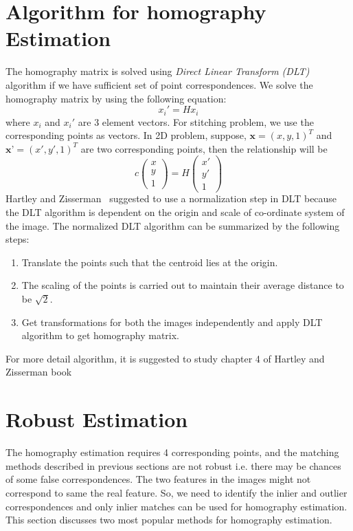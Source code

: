 \section{Algorithm for homography Estimation}
The homography matrix is solved using \emph{Direct Linear Transform (DLT)} algorithm if we have sufficient set of point correspondences. We solve the homography matrix by using the following equation:
\begin{equation}
x_i'=Hx_i
\label{eq:homography-estimation}
\end{equation}
where $x_i$ and $x_i'$ are 3 element vectors. For stitching problem, we use the corresponding points as vectors. In 2D problem, suppose, $\textbf{x}= (x,y,1)^T$ and $\textbf{x'}= (x',y',1)^T$ are two corresponding points, then the relationship will be
\begin{equation}
c\left(
\begin{array}{c}
	x \\
  y \\
	1	
\end{array}
\right)
=H \left( 
\begin{array}{c}
	x' \\
	y' \\
	1
\end{array}
\right)
\label{eq:homography-estimation-detail}
\end{equation}
Hartley and Zisserman~\cite{hartley:04} suggested to use a normalization step in DLT because the DLT algorithm is dependent on the origin and scale of co-ordinate system of the image. The normalized DLT algorithm can be summarized by the following steps:
\begin{enumerate}
	\item Translate the points such that the centroid lies at the origin. 
	\item The scaling of the points is carried out to maintain their average distance to be $\sqrt{2}$.
	\item Get transformations for both the images independently and apply DLT algorithm to get homography matrix. 
\end{enumerate}
For more detail algorithm, it is suggested to study chapter 4 of Hartley and Zisserman book~\cite{hartley:04}


\section{Robust Estimation}
\label{section:robust-estimation}
The homography estimation requires 4 corresponding points, and the matching methods described in previous sections are not robust i.e. there may be chances of some false correspondences. The two features in the images might not correspond to same the real feature. So, we need to identify the inlier and outlier correspondences and only inlier matches can be used for homography estimation. This section discusses two most popular methods for homography estimation.
